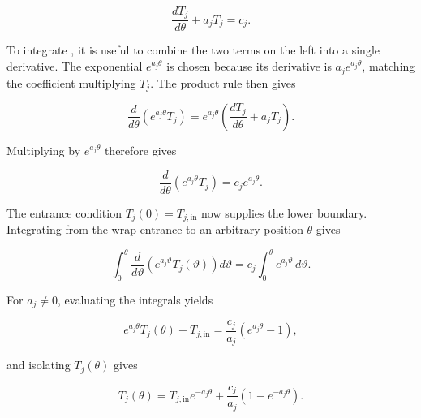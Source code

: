 \documentclass[11pt]{report}
\numberwithin{equation}{section}
\begin{document}
\begin{equation}
    \frac{dT_j}{d\theta}
    +
    a_jT_j
    =
    c_j.
    \label{eq:wrap_ode_standard_form}
\end{equation}

To integrate , it is useful to combine the two
terms on the left into a single derivative. The exponential
\(e^{a_j\theta}\) is chosen because its derivative is
\(a_je^{a_j\theta}\), matching the coefficient multiplying \(T_j\). The
product rule then gives

\begin{equation}
    \frac{d}{d\theta}
    \left(
        e^{a_j\theta}T_j
    \right)
    =
    e^{a_j\theta}
    \left(
        \frac{dT_j}{d\theta}+a_jT_j
    \right).
    \label{eq:wrap_exponential_product_rule}
\end{equation}

Multiplying  by \(e^{a_j\theta}\) therefore
gives

\begin{equation}
    \frac{d}{d\theta}
    \left(
        e^{a_j\theta}T_j
    \right)
    =
    c_je^{a_j\theta}.
    \label{eq:wrap_ode_product_derivative}
\end{equation}

The entrance condition \(T_j(0)=T_{j,\mathrm{in}}\) now supplies the lower
boundary. Integrating from the wrap entrance to an arbitrary position
\(\theta\) gives

\begin{equation}
    \int_0^\theta
    \frac{d}{d\vartheta}
    \left(
        e^{a_j\vartheta}T_j(\vartheta)
    \right)d\vartheta
    =
    c_j
    \int_0^\theta
    e^{a_j\vartheta}\,d\vartheta.
    \label{eq:wrap_ode_integral_step}
\end{equation}

For \(a_j\neq0\), evaluating the integrals yields

\begin{equation}
    e^{a_j\theta}T_j(\theta)
    -
    T_{j,\mathrm{in}}
    =
    \frac{c_j}{a_j}
    \left(
        e^{a_j\theta}-1
    \right),
    \label{eq:wrap_ode_integrated}
\end{equation}

and isolating \(T_j(\theta)\) gives

\begin{equation}
    T_j(\theta)
    =
    T_{j,\mathrm{in}}e^{-a_j\theta}
    +
    \frac{c_j}{a_j}
    \left(
        1-e^{-a_j\theta}
    \right).
    \label{eq:wrap_tension_solution_compact}
\end{equation}
\end{document}
